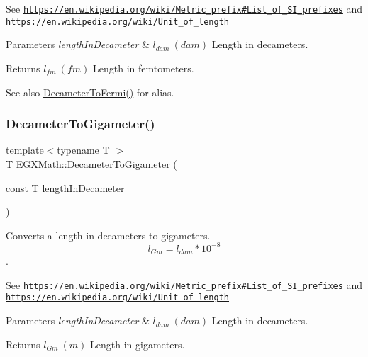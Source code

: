 See \href{https://en.wikipedia.org/wiki/Metric_prefix#List_of_SI_prefixes}{\tt https\+://en.\+wikipedia.\+org/wiki/\+Metric\+\_\+prefix\#\+List\+\_\+of\+\_\+\+S\+I\+\_\+prefixes} and \href{https://en.wikipedia.org/wiki/Unit_of_length}{\tt https\+://en.\+wikipedia.\+org/wiki/\+Unit\+\_\+of\+\_\+length} 
\begin{DoxyParams}{Parameters}
{\em length\+In\+Decameter} & $ l_{dam}\ (dam)$ Length in decameters. \\
\hline
\end{DoxyParams}
\begin{DoxyReturn}{Returns}
$ l_{fm}\ (fm)$ Length in femtometers. 
\end{DoxyReturn}
\begin{DoxySeeAlso}{See also}
\mbox{\hyperlink{group___e_g_x_math-_conversions-_length_conversions-_decameter-_non-_s_i_gadc348f062b782f64f13784377f032f9b}{Decameter\+To\+Fermi()}} for alias. 
\end{DoxySeeAlso}
\mbox{\label{group___e_g_x_math-_conversions-_length_conversions-_decameter-_s_i_gaa889b61d8f9874010be977ce71b4dfaf}} 
\subsubsection{\texorpdfstring{Decameter\+To\+Gigameter()}{DecameterToGigameter()}}
{\footnotesize\ttfamily template$<$typename T $>$ \\
T E\+G\+X\+Math\+::\+Decameter\+To\+Gigameter (\begin{DoxyParamCaption}\item[{const T}]{length\+In\+Decameter }\end{DoxyParamCaption})}



Converts a length in decameters to gigameters. \[ l_{Gm}=l_{dam} * 10^{-8} \]. 

See \href{https://en.wikipedia.org/wiki/Metric_prefix#List_of_SI_prefixes}{\tt https\+://en.\+wikipedia.\+org/wiki/\+Metric\+\_\+prefix\#\+List\+\_\+of\+\_\+\+S\+I\+\_\+prefixes} and \href{https://en.wikipedia.org/wiki/Unit_of_length}{\tt https\+://en.\+wikipedia.\+org/wiki/\+Unit\+\_\+of\+\_\+length} 
\begin{DoxyParams}{Parameters}
{\em length\+In\+Decameter} & $ l_{dam}\ (dam)$ Length in decameters. \\
\hline
\end{DoxyParams}
\begin{DoxyReturn}{Returns}
$ l_{Gm}\ (m)$ Length in gigameters. 
\end{DoxyReturn}
\mbox{\label{group___e_g_x_math-_conversions-_length_conversions-_decameter-_s_i_ga24daff76ac2de77bf8f55d134aa450d8}} 
